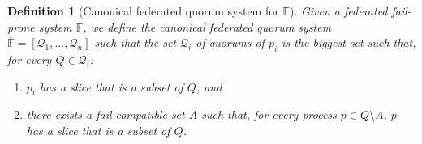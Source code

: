 \documentclass[11pt,letterpaper]{article}
\newtheorem{definition}{Definition}
\begin{document}
\begin{definition}[Canonical federated quorum system for $\mathbb{F}$]
  \label{def:canonical}
  Given a federated fail-prone system $\mathbb{F}$, we define the canonical federated quorum system $\overline{\mathbb{F}}=\left[\mathcal{Q}_1,...,\mathcal{Q}_n\right]$ such that the set $\mathcal{Q}_i$ of quorums of $p_i$ is the biggest set such that, for every $Q\in\mathcal{Q}_i$:
  \begin{enumerate}
    \item $p_i$ has a slice that is a subset of $Q$, and
    \item there exists a fail-compatible set $A$ such that, for every process $p\in Q\setminus A$, $p$ has a slice that is a subset of $Q$.
      \label{item:canonical_2}
  \end{enumerate}
\end{definition}

\end{document}
